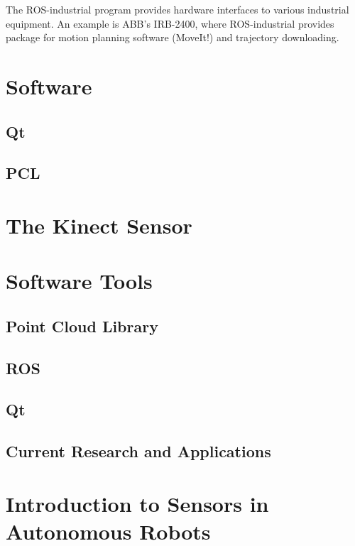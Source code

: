 The ROS-industrial program\cite{ROS_industrial} provides hardware interfaces to various industrial equipment. An example is ABB's IRB-2400, where \ac{ROS}-industrial provides package for motion planning software (MoveIt!) and trajectory downloading\cite{ROS_industria_hardware}. 

\section{Software}

\subsection{Qt}

\subsection{PCL}

\section{The Kinect Sensor}

\section{Software Tools}

\subsection{Point Cloud Library}

\subsection{ROS}

\subsection{Qt}


\subsection{Current Research and Applications}

\section{Introduction to Sensors in Autonomous Robots}

